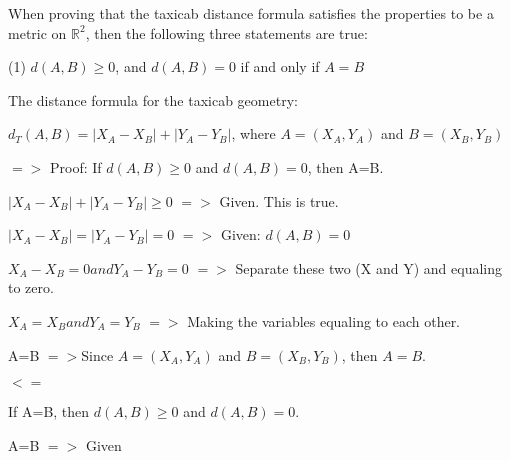 \documentclass{article}
\begin{document}
\vspace{2mm}

When proving that the taxicab distance formula satisfies the properties to be a metric on $\mathbb{R}^{2}$, then the following three statements are true:

\vspace{2mm}

(1) $d(A, B) \ge 0$, and $d(A, B)=0$ if and only if $A=B$

\vspace{2mm}

The distance formula for the taxicab geometry:

\vspace{2mm}


 $d_{T} (A,B)=|X_{A}-X_{B}| + |Y_{A}-Y_{B}|$, where $A=(X_{A},Y_{A})$ and $B=(X_{B},Y_{B})$
 
 \vspace{2mm}
 
 $=>$ Proof: If $d(A, B) \ge 0$ and $d(A, B)=0$, then A=B.
 
 \vspace{2mm}
 
 
$ |X_{A}-X_{B}| + |Y_{A}-Y_{B}| \ge 0$ $=>$ Given. This is true.

\vspace{2mm}


$|X_{A}-X_{B}| = |Y_{A}-Y_{B}|=0$ $=>$ Given: $d(A, B)=0$

\vspace{2mm}


$X_{A}-X_{B}=0 and Y_{A}-Y_{B}=0$ $=>$ Separate these two (X and Y) and equaling to zero.

\vspace{2mm}


$X_{A}=X_{B} and Y_{A}=Y_{B}$ $=>$ Making the variables equaling to each other.

\vspace{2mm}

 A=B $=>$Since $A=(X_{A},Y_{A})$ and $B=(X_{B},Y_{B})$, then $A=B. $
 
 \vspace{5mm}
 
$<=$

\vspace{2mm}

If A=B, then $d(A, B) \ge 0$ and $d(A, B)=0$.

\vspace{2mm}

A=B $=>$ Given 
\end{document}
